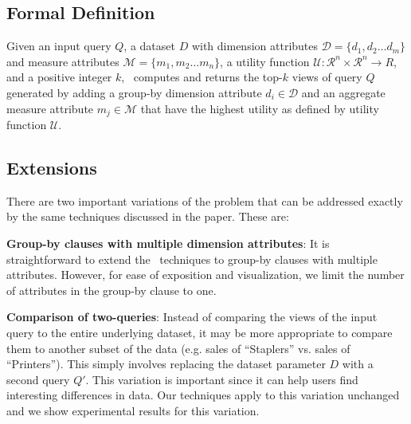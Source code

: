 \subsection{Formal Definition}
Given an input query $Q$, a dataset $D$ with
dimension attributes $\mathcal{D}=\{d_1, d_2\ldots d_m\}$ and measure attributes
$\mathcal{M}=\{m_1, m_2\ldots m_n\}$, a utility function $\mathcal{U}:
\mathcal{R}^n \times \mathcal{R}^n \rightarrow {R}$, and a positive integer $k$,
\SeeDB\ computes and returns the top-$k$ views of query $Q$ generated by adding
a group-by dimension attribute $d_i \in \mathcal{D}$ and an aggregate measure
attribute $m_j \in \mathcal{M}$ that have the highest utility as defined by
utility function $\mathcal{U}$.

\subsection{Extensions}
There are two important variations of the problem that can be addressed exactly
by the same techniques discussed in the paper. These are:
\begin{denselist}
\item {\bf Group-by clauses with multiple dimension attributes}: It is
straightforward to extend the \SeeDB\ techniques  to group-by clauses with multiple attributes.
However, for ease of exposition and visualization, we limit the number of
attributes in the group-by clause to one.
\item {\bf Comparison of two-queries}: Instead of comparing the views of
the input query to the entire underlying dataset, it may be more appropriate to
compare them to another subset of the data (e.g. sales of ``Staplers'' vs.
sales of ``Printers''). This simply involves replacing the dataset parameter $D$
with a second query $Q'$. This variation is important since it can help users
find interesting differences in data. Our techniques apply to this variation
unchanged and we show experimental results for this variation.
\end{denselist} 


